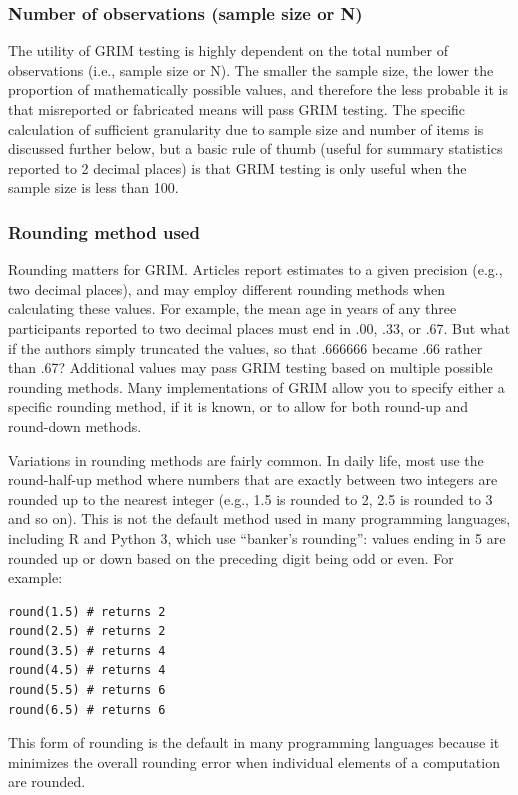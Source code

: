 \documentclass[letterpaper, 12pt]{article}
\begin{document}
\subsubsection*{Number of observations (sample size or N)}

The utility of GRIM testing is highly dependent on the total number of observations (i.e., sample size or N). The smaller the sample size, the lower the proportion of mathematically possible values, and therefore the less probable it is that misreported or fabricated means will pass GRIM testing. The specific calculation of sufficient granularity due to sample size and number of items is discussed further below, but a basic rule of thumb (useful for summary statistics reported to 2 decimal places) is that GRIM testing is only useful when the sample size is less than 100. 

\subsubsection*{Rounding method used}

Rounding matters for GRIM. Articles report estimates to a given precision (e.g., two decimal places), and may employ different rounding methods when calculating these values. For example, the mean age in years of any three participants reported to two decimal places must end in .00, .33, or .67. But what if the authors simply truncated the values, so that .666666 became .66 rather than .67? Additional values may pass GRIM testing based on multiple possible rounding methods. Many implementations of GRIM allow you to specify either a specific rounding method, if it is known, or to allow for both round-up and round-down methods. 

Variations in rounding methods are fairly common. In daily life, most use the round-half-up method where numbers that are exactly between two integers are rounded up to the nearest integer (e.g., 1.5 is rounded to 2, 2.5 is rounded to 3 and so on). This is not the default method used in many programming languages, including R and Python 3, which use ``banker's rounding'': values ending in 5 are rounded up or down based on the preceding digit being odd or even. For example:
\begin{verbatim}
round(1.5) # returns 2
round(2.5) # returns 2
round(3.5) # returns 4
round(4.5) # returns 4
round(5.5) # returns 6
round(6.5) # returns 6
\end{verbatim}
This form of rounding is the default in many programming languages because it minimizes the overall rounding error when individual elements of a computation are rounded.
\end{document}
